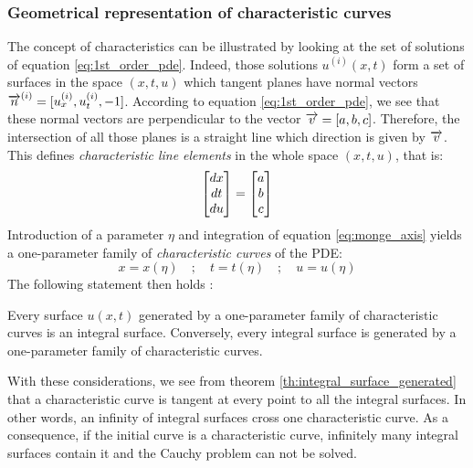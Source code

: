 \subsubsection*{Geometrical representation of characteristic curves}
The concept of characteristics can be illustrated by looking at the set of solutions of equation \eqref{eq:1st_order_pde}. Indeed, those solutions $u^{(i)}(x,t)$ form a set of surfaces in the space $(x,t,u)$ which tangent planes have normal vectors ${\overrightarrow{n}}^{(i)}=[u^{(i)}_x,u^{(i)}_t,-1]$. According to equation \eqref{eq:1st_order_pde}, we see that these normal vectors are perpendicular to the vector ${\overrightarrow{v}}=[a,b,c]$. Therefore, the intersection of all those planes is a straight line which direction is given by ${\overrightarrow{v}}$. This defines \textit{characteristic line elements} in the whole space $(x,t,u)$, that is:
\begin{equation}
  \label{eq:monge_axis}
  \left[\begin{matrix}dx \\ dt \\ du\end{matrix}\right] = \left[\begin{matrix}a \\ b \\c\end{matrix}\right]
\end{equation}
Introduction of a parameter $\eta$ and integration of equation \eqref{eq:monge_axis} yields a one-parameter family of \textit{characteristic curves} of the PDE:
\begin{equation*}
  x=x(\eta) \quad ; \quad t=t(\eta) \quad ; \quad u=u(\eta)
\end{equation*}
The following statement then holds \cite[Chapter~1]{Courant}:
\begin{theorem}
  \label{th:integral_surface_generated}
  Every surface $u(x,t)$ generated by a one-parameter family of characteristic curves is an integral surface. Conversely, every integral surface is generated by a one-parameter family of characteristic curves.
\end{theorem}
With these considerations, we see from theorem \ref{th:integral_surface_generated} that a characteristic curve is tangent at every point to all the integral surfaces. In other words, an infinity of integral surfaces cross one characteristic curve. As a consequence, if the initial curve is a characteristic curve, infinitely many integral surfaces contain it and the Cauchy problem can not be solved.

